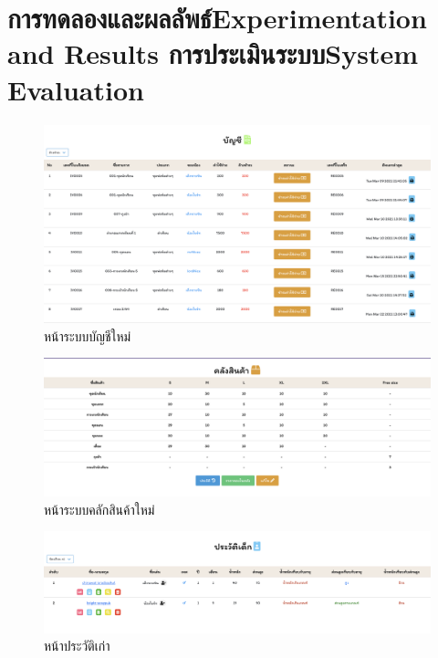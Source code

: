 \chapter{\ifproject%
\ifcpe การทดลองและผลลัพธ์\else Experimentation and Results\fi
\else%
\ifcpe การประเมินระบบ\else System Evaluation\fi
\fi}


\begin{figure}
    \begin{center}
      \includegraphics[width=\linewidth]{images/Payment.png}
    \end{center}
    \caption[Poem]{หน้าระบบบัญชีใหม่}
    \label{fig:PaymentNew}
\end{figure}

\begin{figure}
    \begin{center}
      \includegraphics[width=\linewidth]{images/Stock.png}
    \end{center}
    \caption[Poem]{หน้าระบบคลักสินค้าใหม่}
    \label{fig:StockNew}
\end{figure}

\begin{figure}
    \begin{center}
      \includegraphics[width=\linewidth]{images/Profile.png}
    \end{center}
    \caption[Poem]{หน้าประวัติเก่า}
    \label{fig:ProfileNew}
\end{figure}

